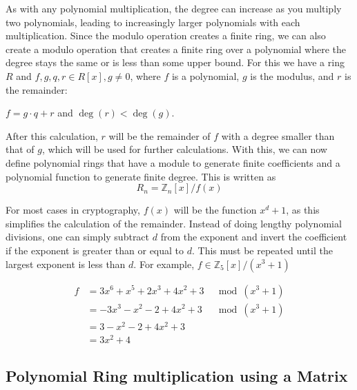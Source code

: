 As with any polynomial multiplication, the degree can increase as you multiply two polynomials, leading to increasingly larger polynomials with each multiplication. Since the modulo operation creates a finite ring, we can also create a modulo operation that creates a finite ring over a polynomial where the degree stays the same or is less than some upper bound. For this we have a ring $R$ and $f, g, q, r \in R[x], g\neq 0$, where $f$ is a polynomial, $g$ is the modulus, and $r$ is the remainder:
\begin{center}
  $f = g\cdot q + r $ and $\deg(r)<\deg(g)$.
\end{center}

After this calculation, $r$ will be the remainder of $f$ with a degree smaller than that of $g$, which will be used for further calculations. With this, we can now define polynomial rings that have a module to generate finite coefficients and a polynomial function to generate finite degree. This is written as 
$$R_n = \mathbb{Z}_n[x]/f(x)$$

For most cases in cryptography, $f(x)$ will be the function $x^d+1$, as this simplifies the calculation of the remainder. Instead of doing lengthy polynomial divisions, one can simply subtract $d$ from the exponent and invert the coefficient if the exponent is greater than or equal to $d$. This must be repeated until the largest exponent is less than $d$. For example, $f \in \mathbb{Z}_5[x]/(x^3+1)$

\begin{align*}
  f &= 3x^6+x^5+2x^3+4x^2+3 &\mod (x^3+1) \\
    &= -3x^3-x^2-2+4x^2+3 &\mod (x^3+1) \\
    &= 3-x^2-2+4x^2+3 \\
    &= 3x^2+4
\end{align*}

\subsection*{Polynomial Ring multiplication using a Matrix}
